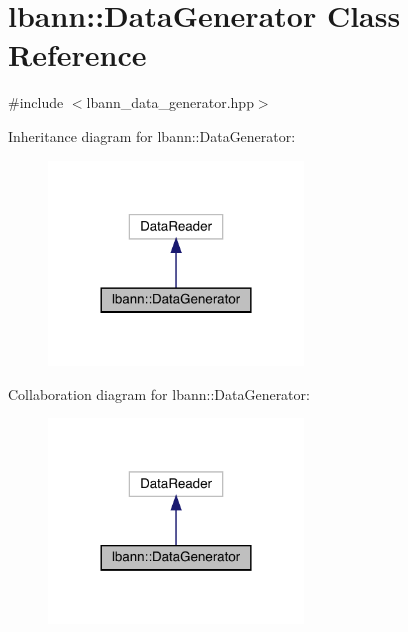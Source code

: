 \hypertarget{classlbann_1_1DataGenerator}{}\section{lbann\+:\+:Data\+Generator Class Reference}
\label{classlbann_1_1DataGenerator}


{\ttfamily \#include $<$lbann\+\_\+data\+\_\+generator.\+hpp$>$}



Inheritance diagram for lbann\+:\+:Data\+Generator\+:\nopagebreak
\begin{figure}[H]
\begin{center}
\leavevmode
\includegraphics[width=192pt]{classlbann_1_1DataGenerator__inherit__graph}
\end{center}
\end{figure}


Collaboration diagram for lbann\+:\+:Data\+Generator\+:\nopagebreak
\begin{figure}[H]
\begin{center}
\leavevmode
\includegraphics[width=192pt]{classlbann_1_1DataGenerator__coll__graph}
\end{center}
\end{figure}
